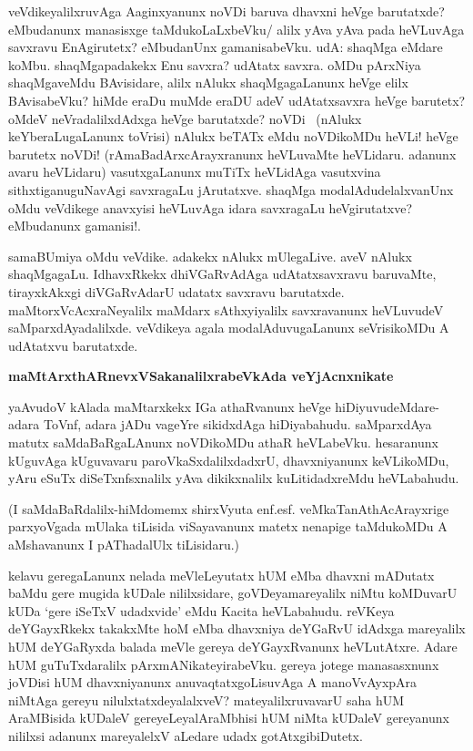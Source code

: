veVdikeyalilxruvAga Aaginxyanunx noVDi baruva dhavxni heVge barutatxde? 
eMbudanunx manasisxge taMdukoLaLxbeVku/ alilx yAva yAva pada heVLuvAga 
savxravu EnAgirutetx? eMbudanUnx gamanisabeVku. udA: shaqMga eMdare 
koMbu. shaqMgapadakekx Enu savxra? udAtatx savxra. oMDu pArxNiya 
shaqMgaveMdu BAvisidare, alilx nAlukx shaqMgagaLanunx heVge elilx 
BAvisabeVku? hiMde eraDu muMde eraDU adeV udAtatxsavxra heVge barutetx? 
oMdeV neVradalilxdAdxga heVge barutatxde? noVDi~ (nAlukx keYberaLugaLanunx toVrisi) nAlukx beTATx eMdu noVDikoMDu heVLi! heVge barutetx noVDi! (rAmaBadArxcArayxranunx heVLuvaMte heVLidaru. adanunx avaru heVLidaru) vasutxgaLanunx muTiTx heVLidAga vasutxvina sithxtiganuguNavAgi savxragaLu jArutatxve. shaqMga modalAdudelalxvanUnx oMdu veVdikege anavxyisi heVLuvAga idara savxragaLu heVgirutatxve? eMbudanunx gamanisi!.

samaBUmiya oMdu veVdike. adakekx nAlukx mUlegaLive. aveV nAlukx 
shaqMgagaLu. IdhavxRkekx dhiVGaRvAdAga udAtatxsavxravu baruvaMte, 
tirayxkAkxgi diVGaRvAdarU udatatx savxravu barutatxde. 
maMtorxVcAcxraNeyalilx maMdarx sAthxyiyalilx savxravanunx heVLuvudeV 
saMparxdAyadalilxde. veVdikeya agala modalAduvugaLanunx seVrisikoMDu A udAtatxvu barutatxde.

\textbf{maMtArxthARnevxVSakanalilxrabeVkAda veYjAcnxnikate}

yaAvudoV kAlada maMtarxkekx IGa athaRvanunx heVge hiDiyuvudeMdare-adara ToVnf, adara jADu vageYre sikidxdAga hiDiyabahudu. saMparxdAya matutx saMdaBaRgaLAnunx noVDikoMDu athaR heVLabeVku. hesaranunx kUguvAga kUguvavaru paroVkaSxdalilxdadxrU, dhavxniyanunx keVLikoMDu, yAru eSuTx diSeTxnfsxnalilx yAva dikikxnalilx kuLitidadxreMdu heVLabahudu.

(I saMdaBaRdalilx-hiMdomemx shirxVyuta enf.esf. veMkaTanAthAcArayxrige 
parxyoVgada mUlaka tiLisida viSayavanunx matetx nenapige taMdukoMDu A aMshavanunx I pAThadalUlx tiLisidaru.)

kelavu geregaLanunx nelada meVleLeyutatx hUM eMba dhavxni mADutatx 
baMdu gere mugida kUDale nililxsidare, goVDeyamareyalilx niMtu 
koMDuvarU kUDa `gere iSeTxV udadxvide' eMdu Kacita heVLabahudu. reVKeya 
deYGayxRkekx takakxMte hoM eMba dhavxniya deYGaRvU idAdxga mareyalilx hUM deYGaRyxda balada meVle gereya deYGayxRvanunx heVLutAtxre. Adare hUM guTuTxdaralilx pArxmANikateyirabeVku. gereya jotege manasasxnunx joVDisi hUM dhavxniyanunx anuvaqtatxgoLisuvAga A manoVvAyxpAra niMtAga gereyu nilulxtatxdeyalalxveV? mateyalilxruvavarU saha hUM AraMBisida kUDaleV gereyeLeyalAraMbhisi hUM niMta kUDaleV gereyanunx nililxsi adanunx mareyalelxV aLedare udadx gotAtxgibiDutetx.


